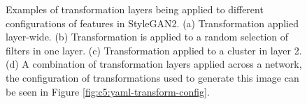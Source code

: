 \begin{figure}[!htb]
    \centering
    \hfill
    \hfill
    \hfill
    \caption[Examples of transformation layers being applied to different configurations of features]{Examples of transformation layers being applied to different configurations of features in StyleGAN2. (a) Transformation applied layer-wide. (b) Transformation is applied to a random selection of filters in one layer. (c) Transformation applied to a cluster in layer 2. (d) A combination of transformation layers applied across a network, the configuration of transformations used to generate this image can be seen in Figure \ref{fig:c5:yaml-transform-config}.}
    \label{fig:c5:layer-transform-types}
 \end{figure}


